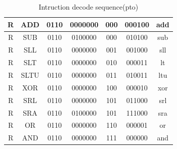 \documentclass[12pt,a4paper]{report}
\begin{document}
\begin{table}[!ht]
\begin{tabular}{|c|c|c|c|c|c|c|}
		R                                                              & ADD                & 0110  & 0000000 & 000    & 000100 & add          \\ \hline
		R                                                              & SUB                & 0110  & 0100000 & 000    & 010100 & sub          \\ \hline
		R                                                              & SLL                & 0110  & 0000000 & 001    & 001000 & sll          \\ \hline
		R                                                              & SLT                & 0110  & 0000000 & 010    & 000011 & lt           \\ \hline
		R                                                              & SLTU               & 0110  & 0000000 & 011    & 010011 & ltu          \\ \hline
		R                                                              & XOR                & 0110  & 0000000 & 100    & 000010 & xor          \\ \hline
		R                                                              & SRL                & 0110  & 0000000 & 101    & 011000 & srl          \\ \hline
		R                                                              & SRA                & 0110  & 0100000 & 101    & 111000 & sra          \\ \hline
		R                                                              & OR                 & 0110  & 0000000 & 110    & 000001 & or           \\ \hline
		R                                                              & AND                & 0110  & 0000000 & 111    & 000000 & and          \\ \hline
\end{tabular}
	\caption{Intruction decode sequence(pto)}
	\label{tab:aluctl(a)}
\end{table}                                                         
\end{document}
